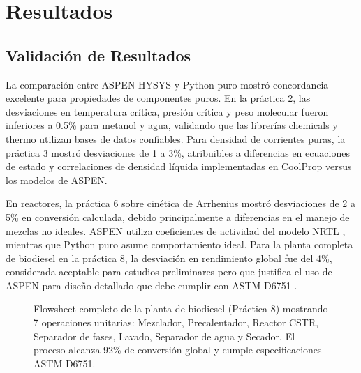 \documentclass{syx7}
\begin{document}
\section{Resultados}

\subsection{Validación de Resultados}

La comparación entre ASPEN HYSYS y Python puro mostró concordancia excelente para propiedades de componentes puros. En la práctica 2, las desviaciones en temperatura crítica, presión crítica y peso molecular fueron inferiores a 0.5\% para metanol y agua, validando que las librerías chemicals \cite{chemicals2023} y thermo \cite{thermo2023} utilizan bases de datos confiables. Para densidad de corrientes puras, la práctica 3 mostró desviaciones de 1 a 3\%, atribuibles a diferencias en ecuaciones de estado y correlaciones de densidad líquida implementadas en CoolProp \cite{bell2016coolprop} versus los modelos de ASPEN.

En reactores, la práctica 6 sobre cinética de Arrhenius \cite{fogler2016elements} mostró desviaciones de 2 a 5\% en conversión calculada, debido principalmente a diferencias en el manejo de mezclas no ideales. ASPEN utiliza coeficientes de actividad del modelo NRTL \cite{renon1968local}, mientras que Python puro asume comportamiento ideal. Para la planta completa de biodiesel en la práctica 8, la desviación en rendimiento global fue del 4\%, considerada aceptable para estudios preliminares pero que justifica el uso de ASPEN para diseño detallado que debe cumplir con ASTM D6751 \cite{astm2020biodiesel}.

\begin{figure}[htb!]
	\centering
	\caption{Flowsheet completo de la planta de biodiesel (Práctica 8) mostrando 7 operaciones unitarias: Mezclador, Precalentador, Reactor CSTR, Separador de fases, Lavado, Separador de agua y Secador. El proceso alcanza 92\% de conversión global y cumple especificaciones ASTM D6751.}
	\label{fig:flowsheet_biodiesel}
\end{figure}
\end{document}
